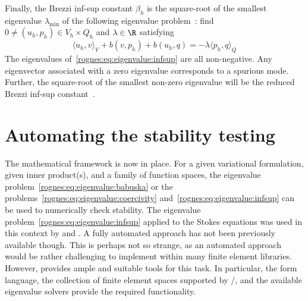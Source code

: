 Finally, the Brezzi inf-sup constant $\beta_h$ is the square-root of
the smallest eigenvalue $\lambda_{\min}$ of the following eigenvalue
problem~\citep{Malkus1981, Qin1994}: find $0 \not = (u_h, p_h) \in V_h
\times Q_h$ and $\lambda \in \R$ satisfying
\begin{equation}
  \label{rognes:eq:eigenvalue:infsup}
  \langle u_h, v \rangle_{V} + b(v, p_h) + b(u_h, q) = - \lambda
  \langle p_h, q \rangle_{Q}
\end{equation}
The eigenvalues of~\eqref{rognes:eq:eigenvalue:infsup} are all non-negative.
Any eigenvector associated with a zero eigenvalue corresponds to a
spurious mode. Further, the square-root of the smallest non-zero
eigenvalue will be the reduced Brezzi inf-sup
constant~\citep{Qin1994}.

\section{Automating the stability testing}
\label{rognes:sec:automation}

The mathematical framework is now in place. For a given variational
formulation, given inner product(s), and a family of function spaces,
the eigenvalue problem~\eqref{rognes:eq:eigenvalue:babuska}
or the problems~\eqref{rognes:eq:eigenvalue:coercivity}
and~\eqref{rognes:eq:eigenvalue:infsup} can be used to numerically check
stability. The eigenvalue problem~\eqref{rognes:eq:eigenvalue:infsup}
applied to the Stokes equations was used in this context by
\citet{Qin1994} and \citet{ChapelleBathe1993}. A fully automated approach
has not been previously available though. This is perhaps not so strange,
as an automated approach would be rather challenging to implement within
many finite element libraries. However, \pydolfin{} provides ample and
suitable tools for this task. In particular, the \ufl{} form language,
the collection of finite element spaces supported by \fiat{}/\ffc{}, and
the available \slepc{} eigenvalue solvers provide the required functionality.

